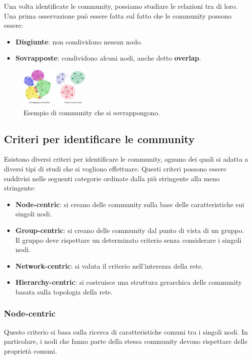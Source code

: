 Una volta identificate le community, possiamo studiare le relazioni tra di loro.
Una prima osservazione può essere fatta sul fatto che le community possono
essere:
\begin{itemize}
    \item \textbf{Disgiunte}: non condividono nessun nodo.
    \item \textbf{Sovrapposte}: condividono alcuni nodi, anche detto \textbf{overlap}.
\end{itemize}
\begin{figure}[!ht]
    \centering
    \includegraphics[width=0.3\textwidth]{./img/net/overlap.png}
    \caption{Esempio di community che si sovrappongono.}
    \label{fig:overlap}
\end{figure}
\subsection{Criteri per identificare le community}
Esistono diversi criteri per identificare le community, ognuno dei quali si adatta
a diversi tipi di studi che si vogliono effettuare. Questi criteri possono essere
suddivisi nelle seguenti categorie  ordinate dalla più stringente alla meno
stringente:
\begin{itemize}
    \item \textbf{Node-centric}: si creano delle community sulla base delle
          caratteristiche sui singoli nodi.
    \item \textbf{Group-centric}: si creano delle community dal punto di vista
          di un gruppo. Il gruppo deve rispettare un determinato criterio senza
          considerare i singoli nodi.
    \item \textbf{Network-centric}: si valuta il criterio nell'interezza della rete.
    \item \textbf{Hierarchy-centric}: si costruisce una struttura gerarchica delle
          community basata sulla topologia della rete.
\end{itemize}
\subsubsection{Node-centric}
Questo criterio si basa sulla ricerca di caratteristiche comuni tra i singoli
nodi. In particolare, i nodi che fanno parte della stessa community devono
rispettare delle proprietà comuni.

